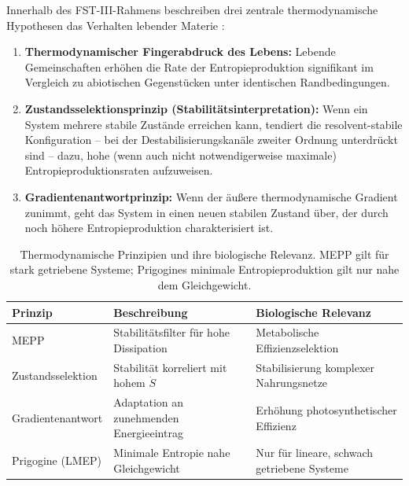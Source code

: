 \documentclass[12pt,a4paper]{article}
\theoremstyle{remark}
\begin{document}
Innerhalb des FST-III-Rahmens beschreiben drei zentrale thermodynamische Hypothesen das Verhalten lebender Materie \citep{EcosystemMEPP}:

\begin{enumerate}
    \item \textbf{Thermodynamischer Fingerabdruck des Lebens:} Lebende Gemeinschaften erh\"ohen die Rate der Entropieproduktion signifikant im Vergleich zu abiotischen Gegenst\"ucken unter identischen Randbedingungen.

    \item \textbf{Zustandsselektionsprinzip (Stabilit\"atsinterpretation):} Wenn ein System mehrere stabile Zust\"ande erreichen kann, tendiert die resolvent-stabile Konfiguration -- bei der Destabilisierungskan\"ale zweiter Ordnung unterdr\"uckt sind -- dazu, hohe (wenn auch nicht notwendigerweise maximale) Entropieproduktionsraten aufzuweisen.

    \item \textbf{Gradientenantwortprinzip:} Wenn der \"au\ss{}ere thermodynamische Gradient zunimmt, geht das System in einen neuen stabilen Zustand \"uber, der durch noch h\"ohere Entropieproduktion charakterisiert ist.
\end{enumerate}

\begin{table}[htbp]
\centering
\caption{Thermodynamische Prinzipien und ihre biologische Relevanz. MEPP gilt f\"ur stark getriebene Systeme; Prigogines minimale Entropieproduktion gilt nur nahe dem Gleichgewicht.}
\label{tab:thermo-principles}
\begin{tabular}{lll}
\toprule
\textbf{Prinzip} & \textbf{Beschreibung} & \textbf{Biologische Relevanz} \\
\midrule
MEPP & Stabilit\"atsfilter f\"ur hohe Dissipation & Metabolische Effizienzselektion \\
Zustandsselektion & Stabilit\"at korreliert mit hohem $\dot{S}$ & Stabilisierung komplexer Nahrungsnetze \\
Gradientenantwort & Adaptation an zunehmenden Energieeintrag & Erh\"ohung photosynthetischer Effizienz \\
Prigogine (LMEP) & Minimale Entropie nahe Gleichgewicht & Nur f\"ur lineare, schwach getriebene Systeme \\
\bottomrule
\end{tabular}
\end{table}
\end{document}
